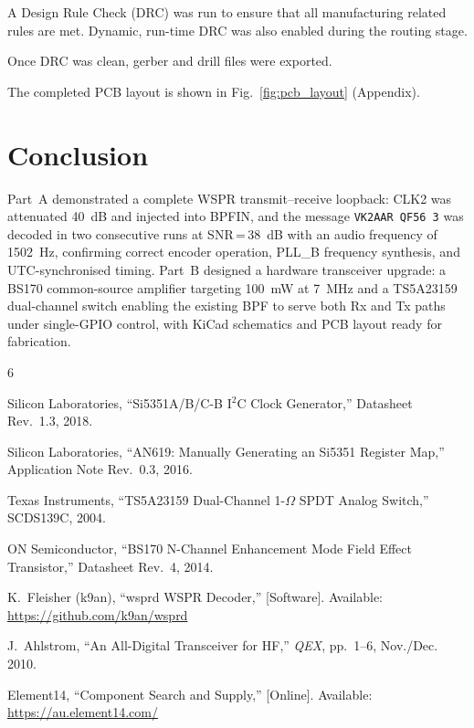 \documentclass[conference]{IEEEtran}
\begin{document}
A Design Rule Check (DRC) was run to ensure that all manufacturing related rules
are met. Dynamic, run-time DRC was also enabled during the routing stage.

Once DRC was clean, gerber and drill files were exported.

The completed PCB layout is shown in Fig.~\ref{fig:pcb_layout} (Appendix).

\section{Conclusion}

Part~A demonstrated a complete WSPR transmit--receive loopback: CLK2 was attenuated
40~dB and injected into BPFIN, and the message \texttt{VK2AAR QF56 3} was decoded
in two consecutive runs at SNR\,=\,38~dB with an audio frequency of 1502~Hz,
confirming correct encoder operation, PLL\_B frequency synthesis, and
UTC-synchronised timing. Part~B designed a hardware transceiver upgrade: a BS170
common-source amplifier targeting 100~mW at 7~MHz and a TS5A23159 dual-channel
switch enabling the existing BPF to serve both Rx and Tx paths under single-GPIO
control, with KiCad schematics and PCB layout ready for fabrication.

\begin{thebibliography}{6}

Silicon Laboratories, ``Si5351A/B/C-B I$^2$C Clock Generator,'' Datasheet
Rev.~1.3, 2018.

Silicon Laboratories, ``AN619: Manually Generating an Si5351 Register Map,''
Application Note Rev.~0.3, 2016.

Texas Instruments, ``TS5A23159 Dual-Channel 1-$\Omega$ SPDT Analog Switch,''
SCDS139C, 2004.

ON Semiconductor, ``BS170 N-Channel Enhancement Mode Field Effect Transistor,''
Datasheet Rev.~4, 2014.

K.~Fleisher (k9an), ``wsprd WSPR Decoder,'' [Software].
Available: \url{https://github.com/k9an/wsprd}

J.~Ahlstrom, ``An All-Digital Transceiver for HF,'' \textit{QEX},
pp.~1--6, Nov./Dec. 2010.

Element14, ``Component Search and Supply,'' [Online].
Available: \url{https://au.element14.com/}

\end{thebibliography}
\end{document}
